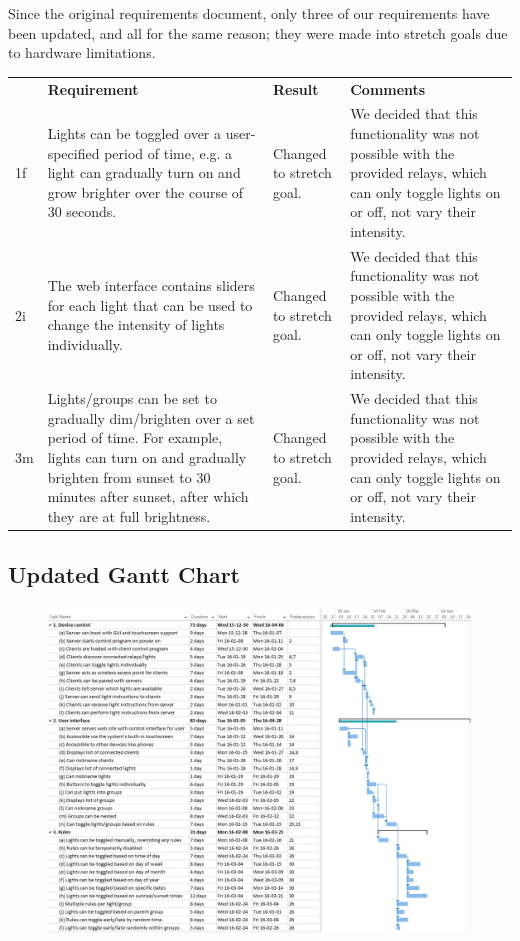 Since the original requirements document, only three of our requirements have
been updated, and all for the same reason; they were made into stretch goals
due to hardware limitations.

\begin{tabular}{ l p{7cm} p{2cm} p{6cm} }
    & \textbf{Requirement} & \textbf{Result} & \textbf{Comments} \\
    1f & Lights can be toggled over a user-specified period of time, e.g. a light can gradually turn on and grow brighter over the course of 30 seconds. & Changed to stretch goal. & We decided that this functionality was not possible with the provided relays, which can only toggle lights on or off, not vary their intensity.\\
    2i & The web interface contains sliders for each light that can be used to change the intensity of lights individually. & Changed to stretch goal. & We decided that this functionality was not possible with the provided relays, which can only toggle lights on or off, not vary their intensity.\\
    3m & Lights/groups can be set to gradually dim/brighten over a set period of time.  For example, lights can turn on and gradually brighten from sunset to 30 minutes after sunset, after which they are at full brightness. & Changed to stretch goal. & We decided that this functionality was not possible with the provided relays, which can only toggle lights on or off, not vary their intensity.\\
\end{tabular}

\subsection{Updated Gantt Chart}

\begin{figure}
\includegraphics[width=1.0\textwidth]{ganttchart-updated.png}
\end{figure}
\pagebreak
